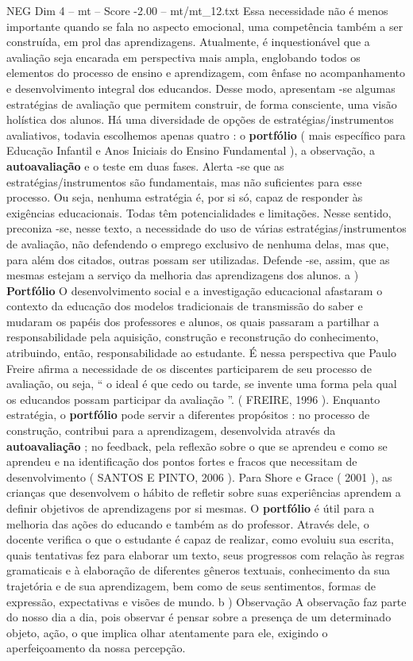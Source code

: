 \begin{textsample}{NEG Dim 4 – mt – Score -2.00 – mt/mt\_12.txt}
Essa necessidade não é menos importante quando se fala no aspecto emocional, uma competência também a ser construída, em prol das aprendizagens.
Atualmente, é inquestionável que a avaliação seja encarada em perspectiva mais ampla, englobando todos os elementos do processo de ensino e aprendizagem, com ênfase no acompanhamento e desenvolvimento integral dos educandos.
Desse modo, apresentam -se algumas estratégias de avaliação que permitem construir, de forma consciente, uma visão holística dos alunos.
Há uma diversidade de opções de estratégias/instrumentos avaliativos, todavia escolhemos apenas quatro : o \textbf{portfólio} ( mais específico para Educação Infantil e Anos Iniciais do Ensino Fundamental ), a observação, a \textbf{autoavaliação} e o teste em duas fases.
Alerta -se que as estratégias/instrumentos são fundamentais, mas não suficientes para esse processo.
Ou seja, nenhuma estratégia é, por si só, capaz de responder às exigências educacionais.
Todas têm potencialidades e limitações.
Nesse sentido, preconiza -se, nesse texto, a necessidade do uso de várias estratégias/instrumentos de avaliação, não defendendo o emprego exclusivo de nenhuma delas, mas que, para além dos citados, outras possam ser utilizadas.
Defende -se, assim, que as mesmas estejam a serviço da melhoria das aprendizagens dos alunos. a ) \textbf{Portfólio} O desenvolvimento social e a investigação educacional afastaram o contexto da educação dos modelos tradicionais de transmissão do saber e mudaram os papéis dos professores e alunos, os quais passaram a partilhar a responsabilidade pela aquisição, construção e reconstrução do conhecimento, atribuindo, então, responsabilidade ao estudante.
É nessa perspectiva que Paulo Freire afirma a necessidade de os discentes participarem de seu processo de avaliação, ou seja, “ o ideal é que cedo ou tarde, se invente uma forma pela qual os educandos possam participar da avaliação ”. ( FREIRE, 1996 ).
Enquanto estratégia, o \textbf{portfólio} pode servir a diferentes propósitos : no processo de construção, contribui para a aprendizagem, desenvolvida através da \textbf{autoavaliação} ; no feedback, pela reflexão sobre o que se aprendeu e como se aprendeu e na identificação dos pontos fortes e fracos que necessitam de desenvolvimento ( SANTOS E PINTO, 2006 ).
Para Shore e Grace ( 2001 ), as crianças que desenvolvem o hábito de refletir sobre suas experiências aprendem a definir objetivos de aprendizagens por si mesmas.
O \textbf{portfólio} é útil para a melhoria das ações do educando e também as do professor.
Através dele, o docente verifica o que o estudante é capaz de realizar, como evoluiu sua escrita, quais tentativas fez para elaborar um texto, seus progressos com relação às regras gramaticais e à elaboração de diferentes gêneros textuais, conhecimento da sua trajetória e de sua aprendizagem, bem como de seus sentimentos, formas de expressão, expectativas e visões de mundo. b ) Observação A observação faz parte do nosso dia a dia, pois observar é pensar sobre a presença de um determinado objeto, ação, o que implica olhar atentamente para ele, exigindo o aperfeiçoamento da nossa percepção.

\end{textsample}
